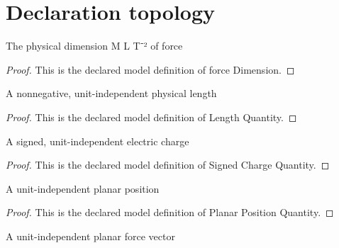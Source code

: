\section{Declaration topology}
\begin{definition}
  \label{def:physics:phyx-mini-0895:phyxminiproblems-problemphyxmini0895-forcedimension}
  The physical dimension M L T⁻² of force
\end{definition}
\begin{proof}
  This is the declared model definition of force Dimension.
\end{proof}
\begin{definition}
  \label{def:physics:phyx-mini-0895:phyxminiproblems-problemphyxmini0895-lengthquantity}
  A nonnegative, unit-independent physical length
\end{definition}
\begin{proof}
  This is the declared model definition of Length Quantity.
\end{proof}
\begin{definition}
  \label{def:physics:phyx-mini-0895:phyxminiproblems-problemphyxmini0895-signedchargequantity}
  A signed, unit-independent electric charge
\end{definition}
\begin{proof}
  This is the declared model definition of Signed Charge Quantity.
\end{proof}
\begin{definition}
  \label{def:physics:phyx-mini-0895:phyxminiproblems-problemphyxmini0895-planarpositionquantity}
  A unit-independent planar position
\end{definition}
\begin{proof}
  This is the declared model definition of Planar Position Quantity.
\end{proof}
\begin{definition}
  \label{def:physics:phyx-mini-0895:phyxminiproblems-problemphyxmini0895-planarforcequantity}
  A unit-independent planar force vector
\end{definition}
